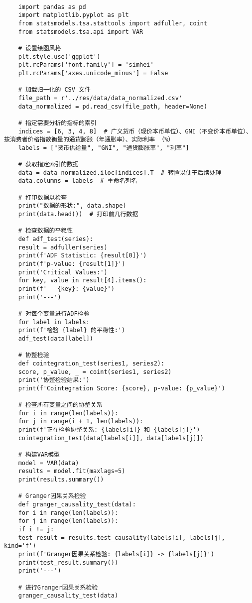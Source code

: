 \begin{lstlisting}[caption={问题三处理代码}]
	
	import pandas as pd
	import matplotlib.pyplot as plt
	from statsmodels.tsa.stattools import adfuller, coint
	from statsmodels.tsa.api import VAR
	
	# 设置绘图风格
	plt.style.use('ggplot')
	plt.rcParams['font.family'] = 'simhei'
	plt.rcParams['axes.unicode_minus'] = False
	
	# 加载归一化的 CSV 文件
	file_path = r'../res/data/data_normalized.csv'
	data_normalized = pd.read_csv(file_path, header=None)
	
	# 指定需要分析的指标的索引
	indices = [6, 3, 4, 8]  # 广义货币（现价本币单位）、GNI（不变价本币单位）、按消费者价格指数衡量的通货膨胀（年通胀率）、实际利率 （%）
	labels = ["货币供给量", "GNI", "通货膨胀率", "利率"]
	
	# 获取指定索引的数据
	data = data_normalized.iloc[indices].T  # 转置以便于后续处理
	data.columns = labels  # 重命名列名
	
	# 打印数据以检查
	print("数据的形状:", data.shape)
	print(data.head())  # 打印前几行数据
	
	# 检查数据的平稳性
	def adf_test(series):
	result = adfuller(series)
	print(f'ADF Statistic: {result[0]}')
	print(f'p-value: {result[1]}')
	print('Critical Values:')
	for key, value in result[4].items():
	print(f'   {key}: {value}')
	print('---')
	
	# 对每个变量进行ADF检验
	for label in labels:
	print(f'检验 {label} 的平稳性:')
	adf_test(data[label])
	
	# 协整检验
	def cointegration_test(series1, series2):
	score, p_value, _ = coint(series1, series2)
	print('协整检验结果:')
	print(f'Cointegration Score: {score}, p-value: {p_value}')
	
	# 检查所有变量之间的协整关系
	for i in range(len(labels)):
	for j in range(i + 1, len(labels)):
	print(f'正在检验协整关系: {labels[i]} 和 {labels[j]}')
	cointegration_test(data[labels[i]], data[labels[j]])
	
	# 构建VAR模型
	model = VAR(data)
	results = model.fit(maxlags=5)
	print(results.summary())
	
	# Granger因果关系检验
	def granger_causality_test(data):
	for i in range(len(labels)):
	for j in range(len(labels)):
	if i != j:
	test_result = results.test_causality(labels[i], labels[j], kind='f')
	print(f'Granger因果关系检验: {labels[i]} -> {labels[j]}')
	print(test_result.summary())
	print('---')
	
	# 进行Granger因果关系检验
	granger_causality_test(data)
	
\end{lstlisting}

